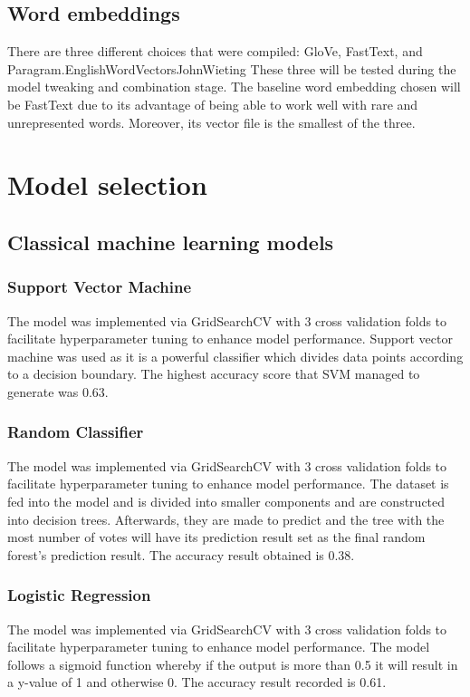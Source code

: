 \documentclass[11pt,a4paper]{article}
\begin{document}
	\subsection{Word embeddings}
	
	There are three different choices that were compiled: GloVe, FastText, and Paragram.\autocite{GloVeGlobalVectors}{EnglishWordVectors}{JohnWieting} These three will be tested during the model tweaking and combination stage. The baseline word embedding chosen will be FastText due to its advantage of being able to work well with rare and unrepresented words.\autocite{GloVeFastTextTwo} Moreover, its vector file is the smallest of the three.
	
	\section{Model selection}
	
	\subsection{Classical machine learning models}
	
	\subsubsection{Support Vector Machine}
	The model was implemented via GridSearchCV with 3 cross validation folds to facilitate hyperparameter tuning to enhance model performance. Support vector machine was used as it is a powerful classifier which divides data points according to a decision boundary. The highest accuracy score that SVM managed to generate was 0.63.
	\subsubsection{Random Classifier}
	The model was implemented via GridSearchCV with 3 cross validation folds to facilitate hyperparameter tuning to enhance model performance. The dataset is fed into the model and is divided into smaller components and are constructed into decision trees. Afterwards, they are made to predict and the tree with the most number of votes will have its prediction result set as the final random forest’s prediction result. The accuracy result obtained is 0.38.
	\subsubsection{Logistic Regression}
	The model was implemented via GridSearchCV with 3 cross validation folds to facilitate hyperparameter tuning to enhance model performance. The model follows a sigmoid function whereby if the output is more than 0.5 it will result in a y-value of 1 and otherwise 0. The accuracy result recorded is 0.61.
\end{document}
